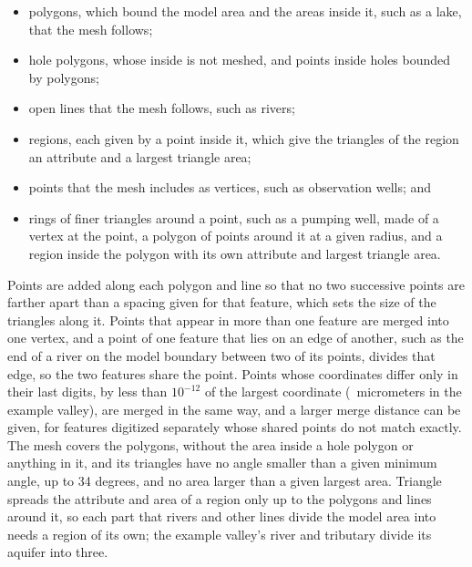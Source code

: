 \documentclass[11pt,twoside,twocolumn]{usgsreport}
\begin{document}
\begin{itemize}
  \item polygons, which bound the model area and the areas inside it, such as a lake, that the mesh follows;
  \item hole polygons, whose inside is not meshed, and points inside holes bounded by polygons;
  \item open lines that the mesh follows, such as rivers;
  \item regions, each given by a point inside it, which give the triangles of the region an attribute and a largest triangle area;
  \item points that the mesh includes as vertices, such as observation wells; and
  \item rings of finer triangles around a point, such as a pumping well, made of a vertex at the point, a polygon of points around it at a given radius, and a region inside the polygon with its own attribute and largest triangle area.
\end{itemize}

Points are added along each polygon and line so that no two successive points are farther apart than a spacing given for that feature, which sets the size of the triangles along it. Points that appear in more than one feature are merged into one vertex, and a point of one feature that lies on an edge of another, such as the end of a river on the model boundary between two of its points, divides that edge, so the two features share the point. Points whose coordinates differ only in their last digits, by less than $10^{-12}$ of the largest coordinate (\valleytolerance~micrometers in the example valley), are merged in the same way, and a larger merge distance can be given, for features digitized separately whose shared points do not match exactly. The mesh covers the polygons, without the area inside a hole polygon or anything in it, and its triangles have no angle smaller than a given minimum angle, up to 34 degrees, and no area larger than a given largest area. Triangle spreads the attribute and area of a region only up to the polygons and lines around it, so each part that rivers and other lines divide the model area into needs a region of its own; the example valley's river and tributary divide its aquifer into three.
\end{document}
